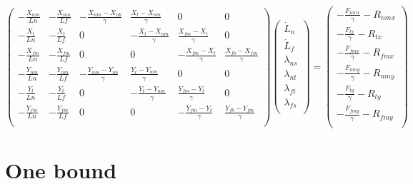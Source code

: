 \documentclass[11pt,twocolumn]{article}
\begin{document}
\[
\begin{pmatrix}
  -\frac{X_{nm}}{Ln} & -\frac{X_{nm}}{Lf}
  & -\frac{X_{nm}-X_{nb}}{\gamma} & \frac{X_{t}-X_{nm}}{\gamma} & 0 & 0\\
  -\frac{X_{t}}{Ln} & -\frac{X_{t}}{Lf}
  & 0 & -\frac{X_{t}-X_{nm}}{\gamma} & \frac{X_{fm}-X_{t}}{\gamma} & 0\\
  -\frac{X_{fm}}{Ln} & -\frac{X_{fm}}{Lf}
  & 0 & 0 & -\frac{X_{fm}-X_{t}}{\gamma} & \frac{X_{fb}-X_{fm}}{\gamma}\\
  -\frac{Y_{nm}}{Ln} & -\frac{Y_{nm}}{Lf}
  & -\frac{Y_{nm}-Y_{nb}}{\gamma} & \frac{Y_{t}-Y_{nm}}{\gamma} & 0 & 0\\
  -\frac{Y_{t}}{Ln} & -\frac{Y_{t}}{Lf}
  & 0 & -\frac{Y_{t}-Y_{nm}}{\gamma} & \frac{Y_{fm}-Y_{t}}{\gamma} & 0\\
  -\frac{Y_{fm}}{Ln} & -\frac{Y_{fm}}{Lf}
  & 0 & 0 & -\frac{Y_{fm}-Y_{t}}{\gamma} & \frac{Y_{fb}-Y_{fm}}{\gamma}\\
\end{pmatrix}
\begin{pmatrix}
  \dot{L}_n\\
  \dot{L}_f\\
  \lambda_{ns}\\
  \lambda_{nt}\\
  \lambda_{ft}\\
  \lambda_{fs}\\
\end{pmatrix}
=
\begin{pmatrix}
  -\frac{F_{nmx}}{\gamma} - R_{nmx}\\
  -\frac{F_{tx}}{\gamma} - R_{tx}\\
  -\frac{F_{fmx}}{\gamma} - R_{fmx}\\
  -\frac{F_{nmy}}{\gamma} - R_{nmy}\\
  -\frac{F_{ty}}{\gamma} - R_{ty}\\
  -\frac{F_{fmy}}{\gamma} - R_{fmy}\\
\end{pmatrix}
\]

\twocolumn

\section{One bound}
\end{document}
